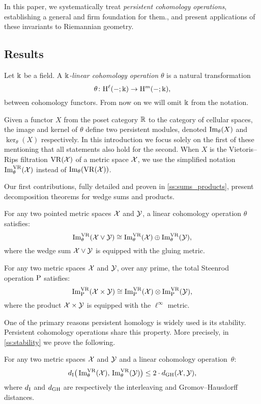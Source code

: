 In this paper, we systematically treat \textit{persistent cohomology operations}, establishing a general and firm foundation for them., and present applications of these invariants to Riemannian geometry.

\subsection*{Results}

Let \(\Bbbk\) be a field.
A \textit{\(\Bbbk\)-linear cohomology operation} \(\theta\) is a natural transformation
\[
\theta \colon \mathrm{H}^\ell(-;\Bbbk) \to \mathrm{H}^m(-;\Bbbk),
\]
between cohomology functors.
From now on we will omit \(\Bbbk\) from the notation.

Given a functor \(X\) from the poset category $\mathbb{R}$ to the category of cellular spaces, the image and kernel of \(\theta\) define two persistent modules, denoted \(\operatorname{Im}_\theta(X)\) and \(\ker_\theta(X)\) respectively.
In this introduction we focus solely on the first of these mentioning that all statements also hold for the second.
When \(X\) is the Vietoris--Rips filtration \(\mathrm{VR}(\mathcal{X})\) of a metric space \(\mathcal{X}\), we use the simplified notation \(\operatorname{Im}_\theta^{\mathrm{VR}}(\mathcal{X})\) instead of \(\operatorname{Im}_\theta(\mathrm{VR}(\mathcal{X}))\).

Our first contributions, fully detailed and proven in \cref{ss:sums_products}, present decomposition theorems for wedge sums and products.

\theorem For any two pointed metric spaces $\mathcal{X}$ and $\mathcal{Y}$, a linear cohomology operation \(\theta\) satisfies:
\[
\operatorname{Im}_\theta^{\mathrm{VR}}(\mathcal{X} \vee \mathcal{Y}) \cong \operatorname{Im}_\theta^{\mathrm{VR}}(\mathcal{X}) \oplus \operatorname{Im}_\theta^{\mathrm{VR}}(\mathcal{Y}),
\]
where the wedge sum \(\mathcal{X} \vee \mathcal{Y}\) is equipped with the gluing metric.

\theorem
For any two metric spaces $\mathcal{X}$ and $\mathcal{Y}$, over any prime, the total Steenrod operation \(\mathrm{P}\) satisfies:
\[
\operatorname{Im}^{\mathrm{VR}}_{\mathrm{P}}(\mathcal{X} \times \mathcal{Y}) \cong \operatorname{Im}^{\mathrm{VR}}_{\mathrm{P}}(\mathcal{X}) \otimes \operatorname{Im}^{\mathrm{VR}}_{\mathrm{P}}(\mathcal{Y}),
\]
where the product \(\mathcal{X} \times \mathcal{Y}\) is equipped with the \(\ell^\infty\) metric.

\medskip One of the primary reasons persistent homology is widely used is its stability.
Persistent cohomology operations share this property.
More precisely, in \cref{ss:stability} we prove the following.

\theorem For any two metric spaces $\mathcal{X}$ and $\mathcal{Y}$ and a linear cohomology operation~$\theta$:
\[
d_{\mathrm{I}}\big(\operatorname{Im}_\theta^{\mathrm{VR}}(\mathcal{X}),\, \operatorname{Im}_\theta^{\mathrm{VR}}(\mathcal{Y})\big) \leq 2 \cdot d_{\mathrm{GH}}(\mathcal{X},\mathcal{Y}),
\]
where \(d_{\mathrm{I}}\) and \(d_{\mathrm{GH}}\) are respectively the interleaving and Gromov--Hausdorff distances.

